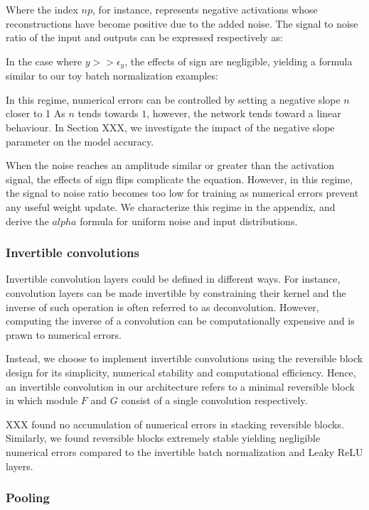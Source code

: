 \documentclass[twocolumn]{bmcart}
\begin{document}
Where the index $np$, for instance, represents negative activations whose reconstructions have become positive due to the added noise. 
The signal to noise ratio of the input and outputs can be expressed respectively as:

In the case where $y >> \epsilon_y$, the effects of sign are negligible, yielding a formula similar to our toy batch normalization examples:

In this regime, numerical errors can be controlled by setting a negative slope $n$ closer to 1
As $n$ tends towards $1$, however, the network tends toward a linear behaviour. In Section XXX, we investigate the impact of the negative slope parameter on the model accuracy.

When the noise reaches an amplitude similar or greater than the activation signal, the effects of sign flips complicate the equation. However, in this regime, the signal to noise ratio becomes too low for training as numerical errors prevent any useful weight update.
We characterize this regime in the appendix, and derive the $alpha$ formula for uniform noise and input distributions.

\subsubsection{Invertible convolutions}

Invertible convolution layers could be defined in different ways.
For instance, convolution layers can be made invertible by constraining their kernel and the inverse of such operation is often referred to as deconvolution. 
However, computing the inverse of a convolution can be computationally expensive and is  prawn to numerical errors.

Instead, we choose to implement invertible convolutions using the reversible block design for its simplicity, numerical stability and computational efficiency.
Hence, an invertible convolution in our architecture refers to a minimal reversible block in which module $F$ and $G$ consist of a single convolution respectively.

XXX \etal found no accumulation of numerical errors in stacking reversible blocks. Similarly, we found reversible blocks extremely stable yielding negligible numerical errors compared to the invertible batch normalization and Leaky ReLU layers.

\subsubsection{Pooling}
\end{document}
